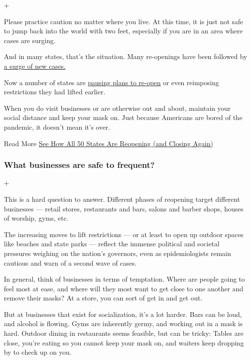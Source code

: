 +

Please practice caution no matter where you live. At this time, it is
just not safe to jump back into the world with two feet, especially if
you are in an area where cases are surging.

And in many states, that's the situation. Many re-openings have been
followed by
\href{https://www.nytimes.com/interactive/2020/07/09/us/coronavirus-cases-reopening-trends.html}{a
surge of new cases.}

Now a number of states are
\href{https://www.nytimes.com/2020/06/25/us/texas-coronavirus-cases-reopening-Greg-Abbott.html}{pausing
plans to re-open} or even reimposing restrictions they had lifted
earlier.

When you do visit businesses or are otherwise out and about, maintain
your social distance and keep your mask on. Just because Americans are
bored of the pandemic, it doesn't mean it's over.

 Read More
\href{https://www.nytimes.com/interactive/2020/us/states-reopen-map-coronavirus.html}{See
How All 50 States Are Reopening (and Closing Again)}

\hypertarget{what-businesses-are-safe-to-frequent}{%
\subsubsection{What businesses are safe to
frequent?}\label{what-businesses-are-safe-to-frequent}}

+

This is a hard question to answer. Different phases of reopening target
different businesses --- retail stores, restaurants and bars, salons and
barber shops, houses of worship, gyms, etc.

The increasing moves to lift restrictions --- or at least to open up
outdoor spaces like beaches and state parks --- reflect the immense
political and societal pressures weighing on the nation's governors,
even as epidemiologists remain cautious and warn of a second wave of
cases.

In general, think of businesses in terms of temptation. Where are people
going to feel most at ease, and where will they most want to get close
to one another and remove their masks? At a store, you can sort of get
in and get out.

But at businesses that exist for socialization, it's a lot harder. Bars
can be loud, and alcohol is flowing. Gyms are inherently germy, and
working out in a mask is hard. Outdoor dining in restaurants seems
feasible, but can be tricky: Tables are close, you're eating so you
cannot keep your mask on, and waiters keep dropping by to check up on
you.

